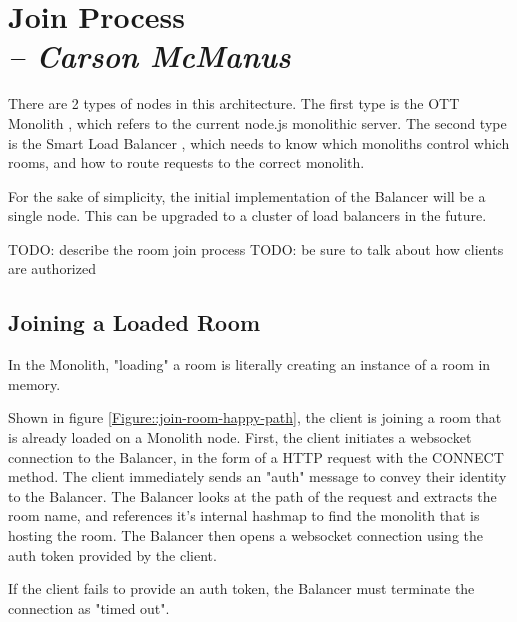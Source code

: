 \chapter{Join Process \\
  \small{\textit{-- Carson McManus}}
  \label{Chapter::JoinProcess}}

There are 2 types of nodes in this architecture. The first type is the OTT Monolith , which refers to the current node.js monolithic server. The second type is the Smart Load Balancer , which needs to know which monoliths control which rooms, and how to route requests to the correct monolith.

For the sake of simplicity, the initial implementation of the Balancer will be a single node. This can be upgraded to a cluster of load balancers in the future.


TODO: describe the room join process
TODO: be sure to talk about how clients are authorized

\section{Joining a Loaded Room }

In the Monolith, "loading" a room is literally creating an instance of a room in memory.

Shown in figure \ref{Figure::join-room-happy-path}, the client is joining a room that is already loaded on a Monolith node. First, the client initiates a websocket  connection to the Balancer, in the form of a HTTP request with the CONNECT method. The client immediately sends an "auth" message to convey their identity to the Balancer. The Balancer looks at the path of the request and extracts the room name, and references it's internal hashmap to find the monolith that is hosting the room. The Balancer then opens a websocket connection using the auth token provided by the client.

If the client fails to provide an auth token, the Balancer must terminate the connection as "timed out".

